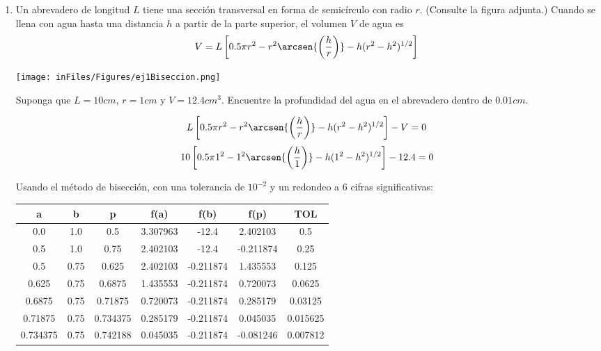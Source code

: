 \documentclass[12pt]{article}
\begin{document}
\begin{enumerate}
    \item Un abrevadero de longitud \(L\) tiene una sección transversal en forma de semicírculo con radio \(r\). (Consulte la
    figura adjunta.) Cuando se llena con agua hasta una distancia \(h\) a partir de la parte superior, el volumen \(V\) de
    agua es
    \[V = L \left[ 0.5\pi r^{2} - r^{2}\arcsen{\left( \frac{h}{r} \right)} - h(r^{2} - h^{2})^{1/2} \right]\]
    \begin{center}
        \texttt{[image: inFiles/Figures/ej1Biseccion.png]} 
    \end{center}

    Suponga que \(L = 10 cm\), \(r = 1 cm \) y \(V = 12.4 cm^{3}\). Encuentre la profundidad del agua en el abrevadero dentro de \(0.01 cm\).

    \[L \left[ 0.5\pi r^{2} - r^{2}\arcsen{\left( \frac{h}{r} \right)} - h(r^{2} - h^{2})^{1/2} \right] - V = 0\]
    \[ 10 \left[ 0.5\pi 1^{2} - 1^{2}\arcsen{\left( \frac{h}{1} \right)} - h(1^{2} - h^{2})^{1/2} \right] - 12.4 = 0 \]
    
    Usando el método de bisección, con una tolerancia de \(10^{-2}\) y un redondeo a 6 cifras significativas:

    \begin{center}
        \begin{tabular}{|c|c|c|c|c|c|c|}
        \hline
        \textbf{a} & \textbf{b} & \textbf{p} & \textbf{f(a)}&\textbf{f(b)}&\textbf{f(p)} &  \textbf{TOL} \\ \hline
        0.0 & 1.0 & 0.5 & 3.307963 & -12.4 & 2.402103 & 0.5 \\
        0.5 & 1.0 & 0.75 & 2.402103 & -12.4 & -0.211874 & 0.25 \\
        0.5 & 0.75 & 0.625 & 2.402103 & -0.211874 & 1.435553 & 0.125 \\
        0.625 & 0.75 & 0.6875 & 1.435553 & -0.211874 & 0.720073 & 0.0625 \\
        0.6875 & 0.75 & 0.71875 & 0.720073 & -0.211874 & 0.285179 & 0.03125 \\
        0.71875 & 0.75 & 0.734375 & 0.285179 & -0.211874 & 0.045035 & 0.015625 \\
        0.734375 & 0.75 & 0.742188 & 0.045035 & -0.211874 & -0.081246 & 0.007812 \\
        \hline
        \end{tabular}
    \end{center}
    

\end{enumerate}
\end{document}
